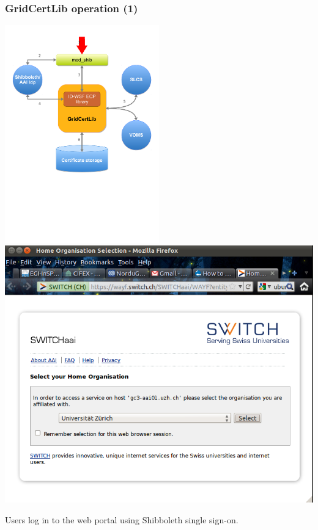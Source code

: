 \documentclass{beamer}
\newcommand{\+}{\vspace{1em}}
\begin{document}
\begin{frame}
  \frametitle{GridCertLib operation (1)}
  \begin{center}
    \includegraphics[width=0.5\textwidth,viewport=0 300 600 650]{architecture1}
    \includegraphics[height=0.50\textheight]{wayf}
  
    \+ Users log in to the web portal using Shibboleth single sign-on.
  \end{center}
\end{frame}
\end{document}
